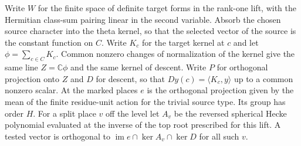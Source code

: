 \documentclass[a4paper,11pt]{article}
\theoremstyle{definition}
\theoremstyle{remark}
\numberwithin{equation}{section}
\begin{document}
Write \(W\) for the finite space of definite target forms in the
rank-one lift, with the Hermitian class-sum pairing linear in the
second variable. Absorb the chosen source character into the theta
kernel, so that the selected vector of the source is the constant
function on \(C\). Write \(K_c\) for the target kernel at \(c\)
and let \(\phi=\sum_{c\in C}K_c\). Common nonzero changes of
normalization of the kernel give the same line
\(Z=\mathbb C\phi\) and the same kernel of descent. Write \(P\)
for orthogonal projection onto \(Z\) and \(D\) for descent,
so that \(D y(c)=\langle K_c,y\rangle\) up to a common
nonzero scalar. At the marked places \(e\) is the orthogonal
projection given by the mean of the finite residue-unit action
for the trivial source type. Its group has order \(H\).
For a split place \(v\) off the level let \(A_v\) be the reversed
spherical Hecke polynomial evaluated at the inverse of the top
root prescribed for this lift. A tested vector is orthogonal to
\(\operatorname{im} e\cap\ker A_v\cap\ker D\) for all such \(v\).
\end{document}
